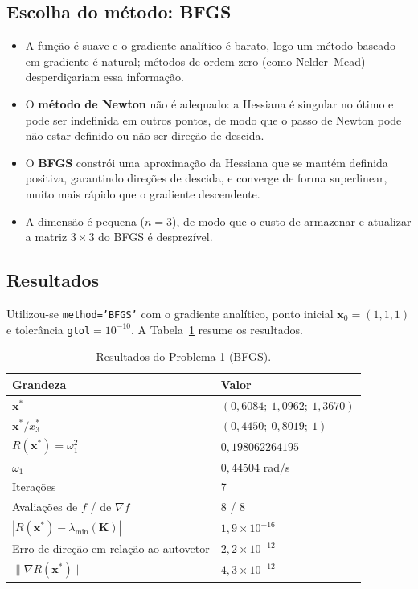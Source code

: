 \documentclass[12pt,a4paper]{article}
\begin{document}
\subsection{Escolha do método: BFGS}

\begin{itemize}
  \item A função é suave e o gradiente analítico é barato, logo um método baseado em gradiente é natural; métodos de ordem zero (como Nelder--Mead) desperdiçariam essa informação.
  \item O \textbf{método de Newton} não é adequado: a Hessiana é singular no ótimo e pode ser indefinida em outros pontos, de modo que o passo de Newton pode não estar definido ou não ser direção de descida.
  \item O \textbf{BFGS} constrói uma aproximação da Hessiana que se mantém definida positiva, garantindo direções de descida, e converge de forma superlinear, muito mais rápido que o gradiente descendente.
  \item A dimensão é pequena ($n=3$), de modo que o custo de armazenar e atualizar a matriz $3\times3$ do BFGS é desprezível.
\end{itemize}

\subsection{Resultados}

Utilizou-se \texttt{method='BFGS'} com o gradiente analítico, ponto inicial $\mathbf{x}_0=(1,1,1)$ e tolerância \texttt{gtol}$=10^{-10}$. A Tabela~\ref{tab:q1} resume os resultados.

\begin{table}[H]
\centering
\caption{Resultados do Problema 1 (BFGS).}
\label{tab:q1}
\begin{tabular}{@{}ll@{}}
\toprule
Grandeza & Valor \\
\midrule
$\mathbf{x}^*$ & $(0{,}6084;\ 1{,}0962;\ 1{,}3670)$ \\
$\mathbf{x}^*/x_3^*$ & $(0{,}4450;\ 0{,}8019;\ 1)$ \\
$R(\mathbf{x}^*) = \omega_1^2$ & $0{,}198062264195$ \\
$\omega_1$ & $0{,}44504$ rad/s \\
Iterações & 7 \\
Avaliações de $f$ / de $\nabla f$ & 8 / 8 \\
$|R(\mathbf{x}^*)-\lambda_{\min}(\mathbf{K})|$ & $1{,}9\times10^{-16}$ \\
Erro de direção em relação ao autovetor & $2{,}2\times10^{-12}$ \\
$\|\nabla R(\mathbf{x}^*)\|$ & $4{,}3\times10^{-12}$ \\
\bottomrule
\end{tabular}
\end{table}
\end{document}
